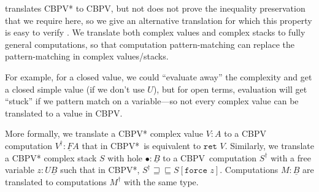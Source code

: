 \documentclass[acmsmall,nonacm]{acmart}
\newif\ifshort
\renewcommand{\u}{\underline}
\newcommand{\cbpv}{CBPV}
\newcommand{\cbpvstar}{CBPV*}
\newcommand{\pipe}{\,\,|\,\,}
\newcommand{\ltdyn}{\sqsubseteq}
\newcommand{\gtdyn}{\sqsupseteq}
\newcommand{\equidyn}{\mathrel{\gtdyn\ltdyn}}
\newcommand{\simp}[1]{{#1}^{\dag}}
\newcommand{\simpp}[1]{\simp{({#1})}}
\newcommand{\bindXtoYinZ}[2]{\kw{bind}#2 \leftarrow #1;}
\newcommand{\case}{\kw{case}}
\newcommand{\kw}[1]{\texttt{#1}\,\,}
\newcommand{\caseofXthenYelseZ}[3]{\case #1 \{ #2 \pipe #3 \}}
\newcommand{\ret}{\kw{ret}}
\newcommand{\force}{\kw{force}}
\begin{document}
\citet{levy03cbpvbook} translates \cbpvstar\/ to \cbpv, but not does not prove
the inequality preservation that we require here, so we give
an
alternative translation for which this property is easy to
verify \ifshort (see the extended version for full details)\fi.
We translate both complex values and complex
stacks to fully general computations, so that computation
pattern-matching can replace the pattern-matching in complex values/stacks.  
\begin{longonly}
For example, for a closed value, we could ``evaluate away''
the complexity and get a closed simple value (if we don't use $U$), but
for open terms, evaluation will get ``stuck'' if we pattern match on
a variable---so not every complex value can be translated to a value in
\cbpv.  
\end{longonly}
More formally, we translate a \cbpvstar\/ complex value $V : A$ to a
\cbpv\/ computation $\simp{V} : \u F A$ that in \cbpvstar\ is equivalent
to $\ret V$.
%
Similarly, we translate a \cbpvstar\/ complex stack $S$ with hole
$\bullet : \u B$ to a \cbpv\  computation $\simp{S}$ with a free
  variable $z : U \u B$ such that in \cbpvstar, $\simp S \equidyn
S[\force z]$.
%
Computations $M : \u B$ are translated to computations $\simp{M}$ with
the same type.
\end{document}
